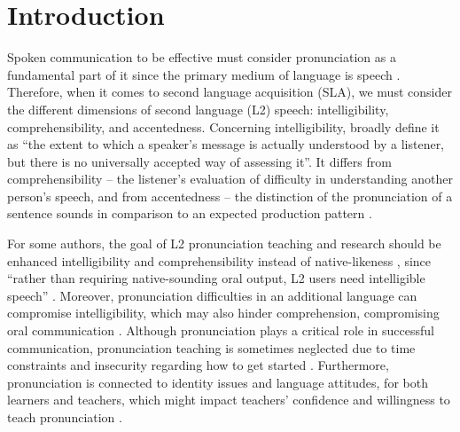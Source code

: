 \documentclass[english]{textolivre}
\begin{document}
\begin{polyabstract}
\begin{portuguese}
\begin{abstract}
\end{abstract}
\end{portuguese}
\end{polyabstract}

\section{Introduction}\label{sec-intro}
Spoken communication to be effective must consider pronunciation as a fundamental part of it \cite{pennington_english_2019} since the primary medium of language is speech \cite{slabakova_second_2016}. Therefore, when it comes to second language acquisition (SLA), we must consider the different dimensions of second language (L2) speech: intelligibility, comprehensibility, and accentedness. Concerning intelligibility, \textcite[p. 289]{munro_foreign_1995} broadly define it as “the extent to which a speaker’s message is actually understood by a listener, but there is no universally accepted way of assessing it”. It differs from comprehensibility – the listener’s evaluation of difficulty in understanding another person’s speech, and from accentedness – the distinction of the pronunciation of a sentence sounds in comparison to an expected production pattern \cite{munro_mutual_2006}.

For some authors, the goal of L2 pronunciation teaching and research should be enhanced intelligibility and comprehensibility instead of native-likeness \cite{obrien_directions_2018}, since “rather than requiring native-sounding oral output, L2 users need intelligible speech” \cite[p. 213]{munoz_symmetries_2008}. Moreover, pronunciation difficulties in an additional language can compromise intelligibility, which may also hinder comprehension, compromising oral communication \cite{sicola_2015}. Although pronunciation plays a critical role in successful communication, pronunciation teaching is sometimes neglected due to time constraints and insecurity regarding how to get started \cite{roccamo_effective_2014}. Furthermore, pronunciation is connected to identity issues and language attitudes, for both learners and teachers, which might impact teachers’ confidence and willingness to teach pronunciation \cite{pennington_english_2019}.	
\end{document}
